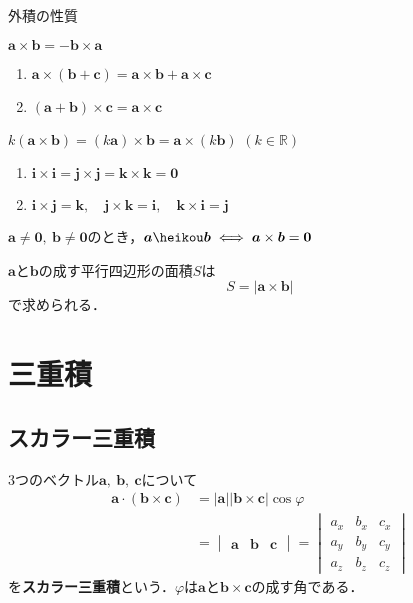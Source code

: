 \begin{kousiki}{外積の性質}
	\begin{enumerate}[label=\textbf{[\arabic*]}, labelsep=10pt, leftmargin=23pt]
		\item $\bm{a} \times \bm{b} = -\bm{b} \times \bm{a}$
		\item 
			\begin{enumerate}[label=(\roman*), labelsep=10pt, leftmargin=23pt]
				\item $\bm{a} \times (\bm{b} + \bm{c}) = \bm{a} \times \bm{b} + \bm{a} \times \bm{c}$
				\item $(\bm{a} + \bm{b}) \times \bm{c} = \bm{a} \times \bm{c}$
			\end{enumerate}
		\item $k(\bm{a} \times \bm{b}) = (k\bm{a}) \times \bm{b} = \bm{a} \times (k\bm{b})$ \qquad $(k \in \mathbb{R})$
		\item
			\begin{enumerate}[label=(\roman*), labelsep=10pt, leftmargin=23pt]
				\item $\bm{i} \times \bm{i} = \bm{j} \times \bm{j} = \bm{k} \times \bm{k} = \bm{0}$
				\item $\bm{i} \times \bm{j} = \bm{k},\quad \bm{j} \times \bm{k} = \bm{i},\quad \bm{k} \times \bm{i} = \bm{j}$
			\end{enumerate}
		\item $\bm{a} \ne \bm{0},\ \bm{b} \ne \bm{0}$のとき，$\bm{a} \heikou \bm{b} \iff \bm{a} \times \bm{b} = \bm{0}$
	\end{enumerate}
	
\end{kousiki}

$\bm{a}$と$\bm{b}$の成す平行四辺形の面積$S$は
\begin{equation}
	S = |\bm{a} \times \bm{b}|
\end{equation}
で求められる．



\section{三重積}
\subsection{スカラー三重積}

3つのベクトル$\bm{a},\ \bm{b},\ \bm{c}$について
\begin{align}
	\bm{a} \cdot (\bm{b} \times \bm{c}) &= |\bm{a}||\bm{b} \times \bm{c}|\cos\varphi \\
	&=
	\begin{vmatrix}
		\bm{a} & \bm{b} & \bm{c}
	\end{vmatrix}
	=
	\begin{vmatrix}
		a_x & b_x & c_x\\
		a_y & b_y & c_y\\
		a_z & b_z & c_z
	\end{vmatrix}
\end{align}
を\textbf{スカラー三重積}という．$\varphi$は$\bm{a}$と$\bm{b} \times \bm{c}$の成す角である．


